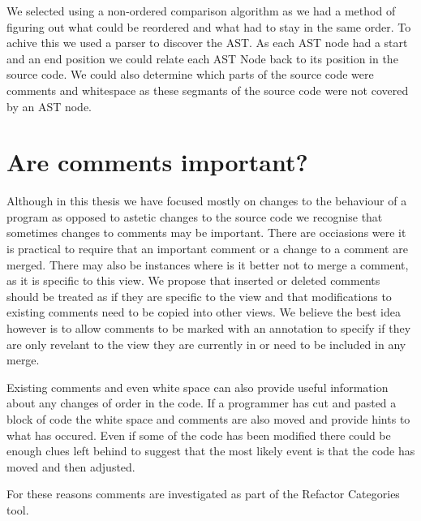 We selected using a non-ordered comparison algorithm as we had a method of figuring out what could be reordered and what had to stay in the same order.  To achive this we used a parser to discover the AST.  As each AST node had a start and an end position we could relate each AST Node back to its position in the source code.  We could also determine which parts of the source code were comments and whitespace as these segmants of the source code were not covered by an AST node.

\section{Are comments important?}
Although in this thesis we have focused mostly on changes to the behaviour of a program as opposed to astetic changes to the source code we recognise that sometimes changes to comments may be important.  There are occiasions were it is practical to require that an important comment or a change to a comment are merged.  There may also be instances where is it better not to merge a comment, as it is specific to this view.  We propose that inserted or deleted comments should be treated as if they are specific to the view and that modifications to existing comments need to be copied into other views.  We believe the best idea however is to allow comments to be marked with an annotation to specify if they are only revelant to the view they are currently in or need to be included in any merge. 

Existing comments and even white space can also provide useful information about any changes of order in the code.  If a programmer has cut and pasted a block of code the white space and comments are also moved and provide hints to what has occured.  Even if some of the code has been modified there could be enough clues left behind to suggest that the most likely event is that the code has moved and then adjusted.

For these reasons comments are investigated as part of the Refactor Categories tool.


